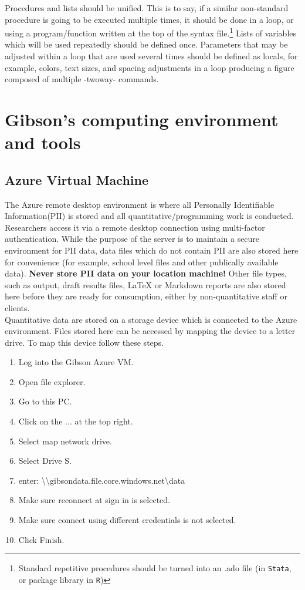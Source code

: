 {Procedures and lists should be unified. This is to say, if a similar non-standard procedure is going to be executed multiple times, it should be done in a loop, or using a program/function written at the top of the syntax file.\footnote{Standard repetitive procedures should be turned into an .ado file (in \texttt{Stata}, or package library in \texttt{R})} Lists of variables which will be used repeatedly should be defined once. Parameters that may be adjusted within a loop that are used several times should be defined as locals, for example, colors, text sizes, and spacing adjustments in a loop producing a figure composed of multiple -twoway- commands.


\section{Gibson\rq{}s computing environment and tools} \label{sec:environment}
\subsection{Azure Virtual Machine}
The Azure remote desktop environment is where all Personally Identifiable Information(PII) is stored and all quantitative/programming work is conducted. Researchers access it via a remote desktop connection using multi-factor authentication. While the purpose of the server is to maintain a secure environment for PII data, data files which do not contain PII are also stored here for convenience (for example, school level files and other publically available data). {\large\textbf{Never store PII data on your location machine!}} Other file types, such as output, draft results files, \LaTeX{} or Markdown reports are also stored here before they are ready for consumption, either by non-quantitative staff or clients. \\

Quantitative data are stored on a storage device which is connected to the Azure environment. Files stored here can be accessed by mapping the device to a letter drive. To map this device follow these steps.

\begin{enumerate}
	\item Log into the Gibson Azure VM.
	\item Open file explorer.
	\item Go to this PC.
	\item Click on the ... at the top right.
	\item Select map network drive.
	\item Select Drive S.
	\item enter: \textbackslash{}\textbackslash{}gibsondata.file.core.windows.net\textbackslash{}data
	\item Make sure reconnect at sign in is selected.
	\item Make sure connect using different credentials is not selected.
	\item Click Finish.
\end{enumerate}

}
